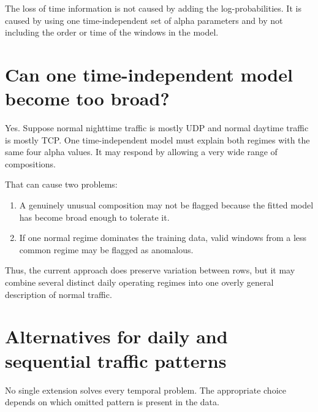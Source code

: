 \documentclass[11pt,a4paper]{article}
\begin{document}
The loss of time information is not caused by adding the log-probabilities.
It is caused by using one time-independent set of alpha parameters and by not
including the order or time of the windows in the model.

\section{Can one time-independent model become too broad?}

Yes.  Suppose normal nighttime traffic is mostly UDP and normal daytime traffic
is mostly TCP.  One time-independent model must explain both regimes with the
same four alpha values.  It may respond by allowing a very wide range of
compositions.

That can cause two problems:

\begin{enumerate}
  \item A genuinely unusual composition may not be flagged because the fitted
        model has become broad enough to tolerate it.
  \item If one normal regime dominates the training data, valid windows from a
        less common regime may be flagged as anomalous.
\end{enumerate}

Thus, the current approach does preserve variation between rows, but it may
combine several distinct daily operating regimes into one overly general
description of normal traffic.

\section{Alternatives for daily and sequential traffic patterns}

No single extension solves every temporal problem.  The appropriate choice
depends on which omitted pattern is present in the data.
\end{document}
